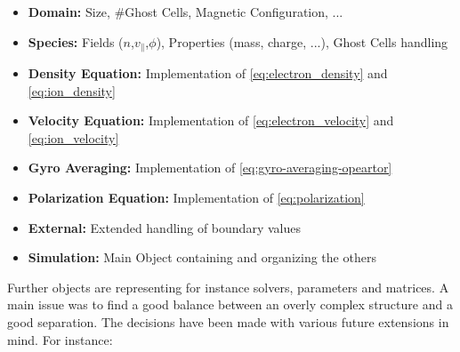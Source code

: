 \documentclass[master.tex]{subfiles}
\begin{document}
\begin{itemize}
  
  \item \textbf{Domain:} Size, \#Ghost Cells, Magnetic Configuration, ...
  \item \textbf{Species:} Fields ($n$,$v_\parallel$,$\phi$), Properties (mass, charge, ...), Ghost Cells handling
  \item \textbf{Density Equation:} Implementation of \autoref{eq:electron_density} and \autoref{eq:ion_density}
  \item \textbf{Velocity Equation:} Implementation of \autoref{eq:electron_velocity} and \autoref{eq:ion_velocity}
  \item \textbf{Gyro Averaging:} Implementation of \autoref{eq:gyro-averaging-opeartor}
  \item \textbf{Polarization Equation:} Implementation of \autoref{eq:polarization}
  \item \textbf{External:} Extended handling of boundary values
  \item \textbf{Simulation:} Main Object containing and organizing the others
  \end{itemize}

Further objects are representing for instance solvers, parameters and matrices.\newline
A main issue was to find a good balance between an overly complex structure and a good separation. The decisions have been made with various future extensions in mind. For instance:
\end{document}
